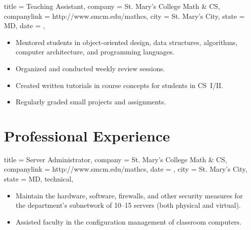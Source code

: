 \documentclass{bettercv}
\begin{document}
\begin{position}
  {
    title   = Teaching Assistant,
    company = St. Mary's College \Dash Math \& CS,
    companylink = http://www.smcm.edu/mathcs,
    city    = St. Mary's City,
    state   = MD,
    date    = ,
  }

\begin{itemize}
\item Mentored students in object-oriented design, data structures, algorithms, computer architecture, and programming languages.
\item Organized and conducted weekly review sessions.
\item Created written tutorials in course concepts for students in CS~I\slash II.
\item Regularly graded small projects and assignments.
\end{itemize}
\end{position}

\section{Professional Experience}

\begin{position}
  {
    title   = Server Administrator,
    company = St. Mary's College \Dash Math \& CS,
    companylink = http://www.smcm.edu/mathcs,
    date    = ,
    city    = St. Mary's City,
    state   = MD,
    technical,
  }

\begin{itemize}
\item Maintain the hardware, software, firewalls, and other security measures
  for the department's subnetwork of 10--15 servers (both physical and virtual).
\item Assisted faculty in the configuration management of classroom computers.
\end{itemize}
\end{position}
\end{document}
